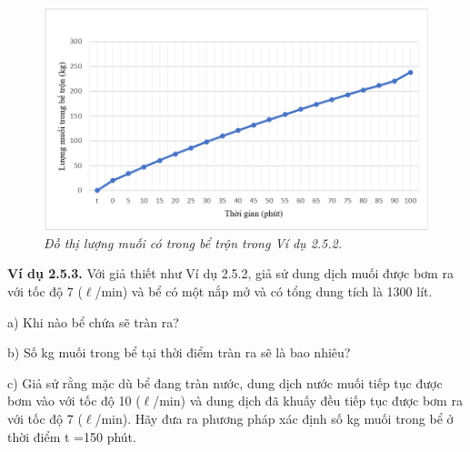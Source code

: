  \begin{figure}[H]
	\centering
	\includegraphics[scale=0.65]{Images/hinh_2_12.png}
	\caption[Đồ thị lượng muối có trong bể trộn trong Ví dụ 2.5.2.
	]{\itshape\fontsize{13pt}{0pt}\selectfont\centering Đồ thị lượng muối có trong bể trộn trong Ví dụ 2.5.2.}
	\label{hinh2.12}
\end{figure}
\noindent\textbf{Ví dụ 2.5.3.} Với giả thiết như Ví dụ 2.5.2, giả sử dung dịch muối được bơm ra với tốc độ 7 ($\ell$/min) và bể có một nắp mở và có tổng dung tích là 1300 lít.

 a) Khi nào bể chứa sẽ tràn ra?
 
 b) Số kg muối trong bể tại thời điểm tràn ra  sẽ là bao nhiêu?
 
 c) Giả sử rằng mặc dù bể đang tràn nước, dung dịch nước muối tiếp tục được bơm vào với tốc độ 10 ($\ell$/min) và dung dịch đã khuấy đều tiếp tục được bơm ra với tốc độ 7 ($\ell$/min). Hãy đưa ra phương pháp xác định số kg muối trong bể ở thời điểm t =150 phút.
 

